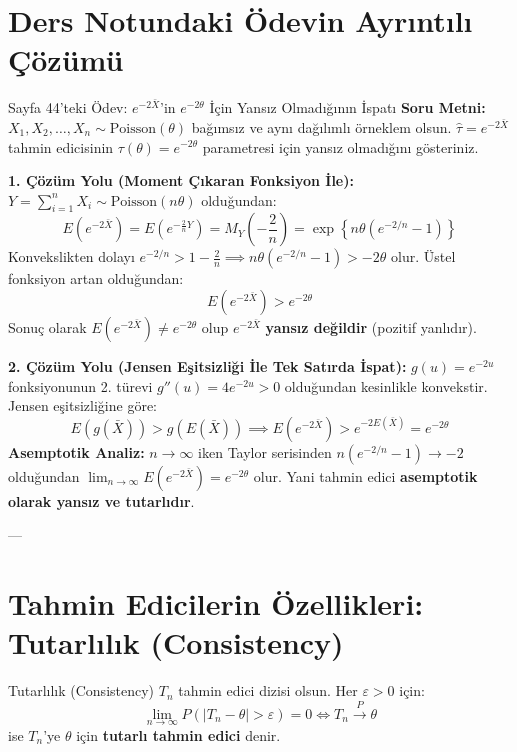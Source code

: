 \documentclass[11pt,a4paper]{article}
\begin{document}
\section{Ders Notundaki Ödevin Ayrıntılı Çözümü}

\begin{odev}{Sayfa 44'teki Ödev: $e^{-2\bar{X}}$'in $e^{-2\theta}$ İçin Yansız Olmadığının İspatı}
\textbf{Soru Metni:} $X_1, X_2, \dots, X_n \sim \text{Poisson}(\theta)$ bağımsız ve aynı dağılımlı örneklem olsun. $\hat{\tau} = e^{-2\bar{X}}$ tahmin edicisinin $\tau(\theta) = e^{-2\theta}$ parametresi için yansız olmadığını gösteriniz.

\bigskip
\textbf{1. Çözüm Yolu (Moment Çıkaran Fonksiyon İle):}
$Y = \sum_{i=1}^n X_i \sim \text{Poisson}(n\theta)$ olduğundan:
\[
E\left( e^{-2\bar{X}} \right) = E\left( e^{-\frac{2}{n} Y} \right) = M_Y\left(-\frac{2}{n}\right) = \exp\left\{ n\theta \left( e^{-2/n} - 1 \right) \right\}
\]
Konvekslikten dolayı $e^{-2/n} > 1 - \frac{2}{n} \implies n\theta(e^{-2/n} - 1) > -2\theta$ olur. Üstel fonksiyon artan olduğundan:
\[
E\left( e^{-2\bar{X}} \right) > e^{-2\theta}
\]
Sonuç olarak $E(e^{-2\bar{X}}) \neq e^{-2\theta}$ olup $e^{-2\bar{X}}$ \textbf{yansız değildir} (pozitif yanlıdır).

\bigskip
\textbf{2. Çözüm Yolu (Jensen Eşitsizliği İle Tek Satırda İspat):}
$g(u) = e^{-2u}$ fonksiyonunun 2. türevi $g''(u) = 4e^{-2u} > 0$ olduğundan kesinlikle konvekstir. Jensen eşitsizliğine göre:
\[
E(g(\bar{X})) > g(E(\bar{X})) \implies E\left( e^{-2\bar{X}} \right) > e^{-2 E(\bar{X})} = e^{-2\theta}
\]
\textbf{Asemptotik Analiz:} $n \to \infty$ iken Taylor serisinden $n(e^{-2/n}-1) \to -2$ olduğundan $\lim_{n \to \infty} E(e^{-2\bar{X}}) = e^{-2\theta}$ olur. Yani tahmin edici \textbf{asemptotik olarak yansız ve tutarlıdır}.
\end{odev}

---

\section{Tahmin Edicilerin Özellikleri: Tutarlılık (Consistency)}

\begin{tanim}{Tutarlılık (Consistency)}
$T_n$ tahmin edici dizisi olsun. Her $\varepsilon > 0$ için:
\[
\lim_{n\to\infty} P\left( |T_n - \theta| > \varepsilon \right) = 0 \iff T_n \xrightarrow{P} \theta
\]
ise $T_n$'ye $\theta$ için \textbf{tutarlı tahmin edici} denir.
\end{tanim}
\end{document}
